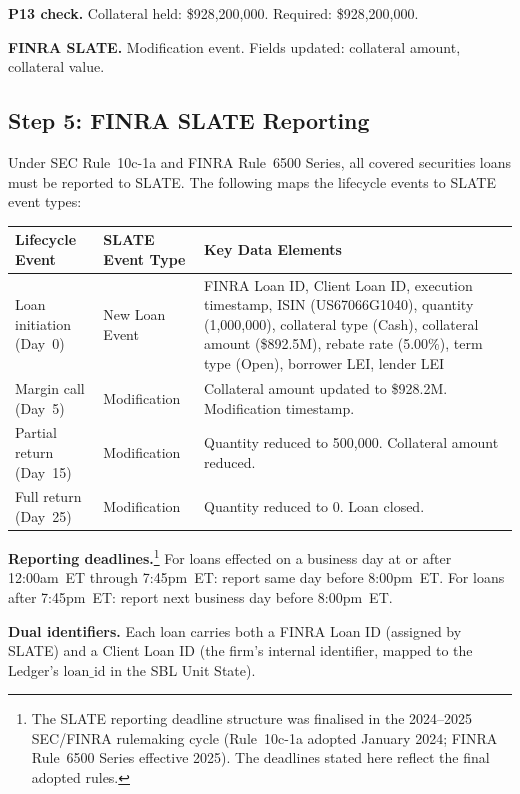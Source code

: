 \documentclass[11pt,a4paper]{article}
\begin{document}
\noindent\textbf{P13 check.} Collateral held: \$928{,}200{,}000. Required: \$928{,}200{,}000. \checkmark

\noindent\textbf{FINRA SLATE.} Modification event. Fields updated: collateral amount, collateral value.

\subsection{Step 5: FINRA SLATE Reporting}
\label{sec:us-step5}

Under SEC Rule~10c-1a and FINRA Rule~6500 Series, all covered securities loans must be reported to SLATE. The following maps the lifecycle events to SLATE event types:

\begin{center}\small
\begin{tabular}{l l p{6cm}}
\toprule
\textbf{Lifecycle Event} & \textbf{SLATE Event Type} & \textbf{Key Data Elements} \\
\midrule
Loan initiation (Day~0) & New Loan Event & FINRA Loan ID, Client Loan ID, execution timestamp, ISIN (US67066G1040), quantity (1{,}000{,}000), collateral type (Cash), collateral amount (\$892.5M), rebate rate (5.00\%), term type (Open), borrower LEI, lender LEI \\
\midrule
Margin call (Day~5) & Modification & Collateral amount updated to \$928.2M. Modification timestamp. \\
\midrule
Partial return (Day~15) & Modification & Quantity reduced to 500{,}000. Collateral amount reduced. \\
\midrule
Full return (Day~25) & Modification & Quantity reduced to 0. Loan closed. \\
\bottomrule
\end{tabular}
\end{center}

\noindent\textbf{Reporting deadlines.}\footnote{The SLATE reporting deadline structure was finalised in the 2024--2025 SEC/FINRA rulemaking cycle (Rule~10c-1a adopted January 2024; FINRA Rule~6500 Series effective 2025). The deadlines stated here reflect the final adopted rules.} For loans effected on a business day at or after 12:00am~ET through 7:45pm~ET: report same day before 8:00pm~ET. For loans after 7:45pm~ET: report next business day before 8:00pm~ET.

\noindent\textbf{Dual identifiers.} Each loan carries both a FINRA Loan ID (assigned by SLATE) and a Client Loan ID (the firm's internal identifier, mapped to the Ledger's $\mathrm{loan\_id}$ in the SBL Unit State).
\end{document}
